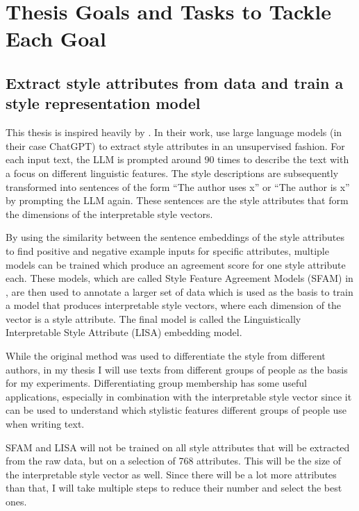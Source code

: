 
\section{Thesis Goals and Tasks to Tackle Each Goal}
\subsection{Extract style attributes from data and train a style representation model}
This thesis is inspired heavily by \citet{patelLearningInterpretableStyle2023}. In their work, \citeauthor{patelLearningInterpretableStyle2023} use large language models (in their case ChatGPT) to extract style attributes in an unsupervised fashion. For each input text, the LLM is prompted around 90 times to describe the text with a focus on different linguistic features. The style descriptions are subsequently transformed into sentences of the form \enquote{The author uses x} or \enquote{The author is x} by prompting the LLM again. These sentences are the style attributes that form the dimensions of the interpretable style vectors.

By using the similarity between the sentence embeddings of the style attributes to find positive and negative example inputs for specific attributes, multiple models can be trained which produce an agreement score for one style attribute each. These models, which are called Style Feature Agreement Models (SFAM) in \citet{patelLearningInterpretableStyle2023}, are then used to annotate a larger set of data which is used as the basis to train a model that produces interpretable style vectors, where each dimension of the vector is a style attribute. The final model is called the Linguistically Interpretable Style Attribute (LISA) embedding model.

While the original method was used to differentiate the style from different authors, in my thesis I will use texts from different groups of people as the basis for my experiments. Differentiating group membership has some useful applications, especially in combination with the interpretable style vector since it can be used to understand which stylistic features different groups of people use when writing text. %

SFAM and LISA will not be trained on all style attributes that will be extracted from the raw data, but on a selection of 768 attributes. This will be the size of the interpretable style vector as well. Since there will be a lot more attributes than that, I will take multiple steps to reduce their number and select the best ones.

